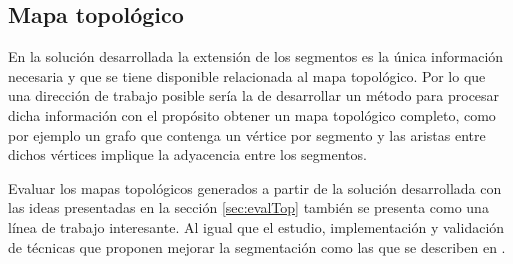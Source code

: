


\subsection{Mapa topológico}

En la solución desarrollada la extensión de los segmentos es la única
información necesaria y que se tiene disponible relacionada al mapa topológico.
Por lo que una dirección de trabajo posible sería la de desarrollar un método
para procesar dicha información con el propósito obtener un mapa topológico
completo, como por ejemplo un grafo que contenga un vértice por segmento y las
aristas entre dichos vértices implique la adyacencia entre los segmentos.

Evaluar los mapas topológicos generados a partir de la solución desarrollada
con las ideas presentadas en la sección \ref{sec:evalTop} también se presenta
como una línea de trabajo interesante. Al igual que el estudio, implementación
y validación de técnicas que proponen mejorar la segmentación como las que se
describen en \cite{Thrun1998,wurm2008coordinated,Liu2015}.









